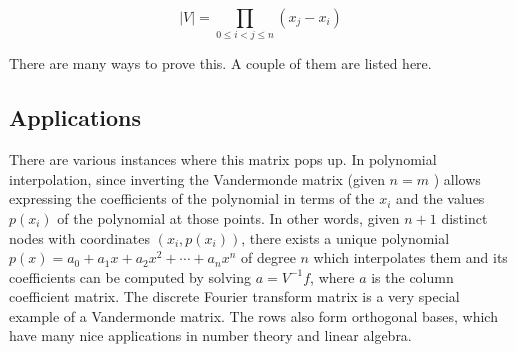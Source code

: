 \documentclass{article}
\begin{document}
$$\boxed{\left| V \right|=\prod_{0\le i<j\le n}\left(x_j-x_i\right)}$$

There are many ways to prove this. A couple of them are listed here\cite{citation1}.
\subsection{Applications}

There are various instances where this matrix pops up. In polynomial interpolation, since inverting the Vandermonde matrix (given $n=m$ ) allows expressing the coefficients of the polynomial in terms of the $x_i$ and the values $p\left(x_i\right)$ of the polynomial at those points. In other words, given $n+1$ distinct nodes with coordinates $\left(x_i, p\left(x_i\right)\right)$, there exists a unique polynomial $p(x)=a_0+a_1 x+a_2 x^2+\cdots+a_n x^n$ of degree $n$ which interpolates them and its coefficients can be computed by solving $a=V^{-1} f$, where $a$ is the column coefficient matrix. The discrete Fourier transform matrix is a very special example of a Vandermonde matrix\cite{citation2}.
\vskip0.5cm
The rows also form orthogonal bases, which have many nice applications in number theory and linear algebra.



\newpage
{}

\end{document}
